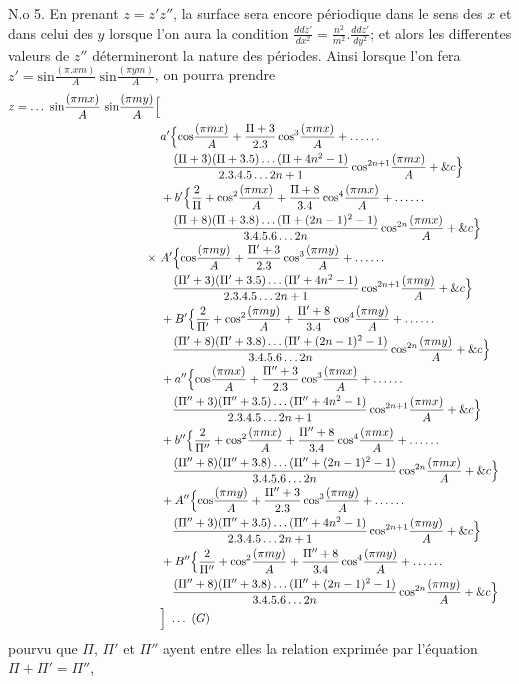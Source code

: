 \documentclass[11pt,a4paper]{article}
\begin{document}
N.o 5. En prenant $z = z'z''$, la surface sera encore périodique
dans le sens des $x$ et dans celui des $y$ lorsque l'on aura la condition
$\frac{ddz'}{dx^2} = \frac{n^2}{m^2}.\frac{ddz'}{dy^2}$; et alors les differentes valeurs de $z''$ détermineront la
nature des périodes. Ainsi lorsque l'on fera $z' = \text{sin}\frac{(\pi.xm)}{A}\ \text{sin}\frac{(\pi ym)}{A}$, on pourra
prendre
\begin{align*}
z = \ldots\ \text{sin}\frac{(\pi mx)}{A}\ \text{sin}\frac{(\pi my)}{A}\Bigl[\\ &a'\Bigl\{\text{cos}\frac{(\pi mx)}{A} + \frac{\Pi+3}{2.3}\,\text{cos}^3\frac{(\pi mx)}{A} + \ldots\ldots\\
&\quad \frac{(\Pi+3)(\Pi+3.5)\ldots(\Pi+4n^2-1)}{2.3.4.5\ldots 2n+1}\,\text{cos}^{2n+1}\frac{(\pi mx)}{A} + \&c\Bigr\}\\
&+b'\Bigl\{\frac{2}{\Pi} + \text{cos}^2\frac{(\pi mx)}{A} + \frac{\Pi+8}{3.4}\,\text{cos}^4\frac{(\pi mx)}{A} + \ldots\ldots\\
&\quad \frac{(\Pi+8)(\Pi+3.8)\ldots(\Pi+(2n-1)^2-1)}{3.4.5.6\ldots 2n}\,\text{cos}^{2n}\frac{(\pi mx)}{A} + \&c\Bigr\}\\
\times\ &A'\Bigl\{\text{cos}\frac{(\pi my)}{A} + \frac{\Pi'+3}{2.3}\,\text{cos}^3\frac{(\pi my)}{A} + \ldots\ldots\\
&\quad \frac{(\Pi'+3)(\Pi'+3.5)\ldots(\Pi'+4n^2-1)}{2.3.4.5\ldots 2n+1}\,\text{cos}^{2n+1}\frac{(\pi my)}{A} + \&c\Bigr\}\\
&+B'\Bigl\{\frac{2}{\Pi'} + \text{cos}^2\frac{(\pi my)}{A} + \frac{\Pi'+8}{3.4}\,\text{cos}^4\frac{(\pi my)}{A} + \ldots\ldots\\
&\quad \frac{(\Pi'+8)(\Pi'+3.8)\ldots(\Pi'+(2n-1)^2-1)}{3.4.5.6\ldots 2n}\,\text{cos}^{2n}\frac{(\pi my)}{A} + \&c\Bigr\}\\
&+a''\Bigl\{\text{cos}\frac{(\pi mx)}{A} + \frac{\Pi''+3}{2.3}\,\text{cos}^3\frac{(\pi mx)}{A} + \ldots\ldots\\
&\quad \frac{(\Pi''+3)(\Pi''+3.5)\ldots(\Pi''+4n^2-1)}{2.3.4.5\ldots 2n+1}\,\text{cos}^{2n+1}\frac{(\pi mx)}{A} + \&c\Bigr\}\\
&+b''\Bigl\{\frac{2}{\Pi''} + \text{cos}^2\frac{(\pi mx)}{A} + \frac{\Pi''+8}{3.4}\,\text{cos}^4\frac{(\pi mx)}{A} + \ldots\ldots\\
&\quad \frac{(\Pi''+8)(\Pi''+3.8)\ldots(\Pi''+(2n-1)^2-1)}{3.4.5.6\ldots 2n}\,\text{cos}^{2n}\frac{(\pi mx)}{A} + \&c\Bigr\}\\
&+A''\Bigl\{\text{cos}\frac{(\pi my)}{A} + \frac{\Pi''+3}{2.3}\,\text{cos}^3\frac{(\pi my)}{A} + \ldots\ldots\\
&\quad \frac{(\Pi''+3)(\Pi''+3.5)\ldots(\Pi''+4n^2-1)}{2.3.4.5\ldots 2n+1}\,\text{cos}^{2n+1}\frac{(\pi my)}{A} + \&c\Bigr\}\\
&+B''\Bigl\{\frac{2}{\Pi''} + \text{cos}^2\frac{(\pi my)}{A} + \frac{\Pi''+8}{3.4}\,\text{cos}^4\frac{(\pi my)}{A} + \ldots\ldots\\
&\quad \frac{(\Pi''+8)(\Pi''+3.8)\ldots(\Pi''+(2n-1)^2-1)}{3.4.5.6\ldots 2n}\,\text{cos}^{2n}\frac{(\pi my)}{A} + \&c\Bigr\}\\
&\Bigr]\ \ldots\ (G)
\end{align*}
pourvu que $\Pi$, $\Pi'$ et $\Pi''$ ayent entre elles la relation exprimée par l'équation
$\Pi+\Pi' = \Pi''$,
\end{document}
